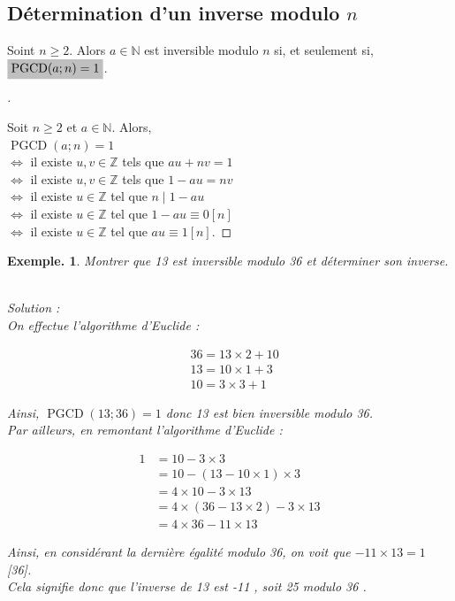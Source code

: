 \documentclass[12pt]{article}
\newcommand{\hideM}[1]{\mbox{\vphantom{$#1$}\smash{\colorbox{gray!50}{$\displaystyle #1$}}} }
\theoremstyle{break}
\newtheorem*{example}{Exemple.}
\newenvironment{demo}[1][\proofname]{%
  \begin{proof}[#1]$ $\newline
}{%
  \end{proof}
}
\begin{document}
\subsection{Détermination d'un inverse modulo $n$}
\begin{proposition}{}{}
Soint $n \geqslant 2$. Alors $a \in \mathbb{N}$ est inversible modulo $n$ si, et seulement si, $\hideM{\operatorname{PGCD}(a ; n)=1}$.
\end{proposition}

\begin{demo}
Soit $n \geqslant 2$ et $a \in \mathbb{N}$. Alors,\\
$\operatorname{PGCD}(a ; n)=1$\\
$\Longleftrightarrow$ il existe $u, v \in \mathbb{Z}$ tels que $a u+n v=1$\\
$\Longleftrightarrow$ il existe $u, v \in \mathbb{Z}$ tels que $1-a u=n v$\\
$\Longleftrightarrow$ il existe $u \in \mathbb{Z}$ tel que $n \mid 1-a u$\\
$\Longleftrightarrow$ il existe $u \in \mathbb{Z}$ tel que $1-a u \equiv 0[n]$\\
$\Longleftrightarrow$ il existe $u \in \mathbb{Z}$ tel que $a u \equiv 1[n]$.
\end{demo}

\begin{example}
Montrer que 13 est inversible modulo 36 et déterminer son inverse.

~\\Solution :\\
On effectue l'algorithme d'Euclide :

$$
\begin{aligned}
& 36=13 \times 2+10 \\
& 13=10 \times 1+3 \\
& 10=3 \times 3+1
\end{aligned}
$$

Ainsi, $\operatorname{PGCD}(13 ; 36)=1$ donc 13 est bien inversible modulo 36.\\
Par ailleurs, en remontant l'algorithme d'Euclide :

$$
\begin{aligned}
1 & =10-3 \times 3 \\
& =10-(13-10 \times 1) \times 3 \\
& =4 \times 10-3 \times 13 \\
& =4 \times(36-13 \times 2)-3 \times 13 \\
& =4 \times 36-11 \times 13
\end{aligned}
$$

Ainsi, en considérant la dernière égalité modulo 36, on voit que $-11 \times 13=1$ [36].\\
Cela signifie donc que l'inverse de 13 est -11 , soit 25 modulo 36 .
\end{example}
\end{document}
